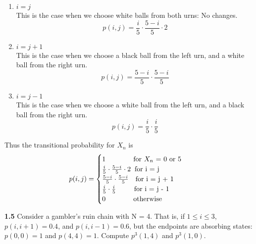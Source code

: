 \documentclass[12pt]{article}
\begin{document}
\begin{enumerate}[label=(\alph*)]
    \item $i = j$\\
          This is the case when we choose white balls from both urns: No changes. 
          $$p(i,j) = \frac{i}{5} \cdot \frac{5-i}{5} \cdot 2$$
    \item $i = j + 1$\\
          This is the case when we choose a black ball from the left urn, and a white ball from the right urn.
          $$p(i,j) = \frac{5-i}{5} \cdot \frac{5-i}{5}$$
    \item $i = j - 1 $\\
          This is the case when we choose a white ball from the left urn, and a black ball from the right urn.
          $$p(i,j) = \frac{i}{5} \cdot \frac{i}{5}$$
\end{enumerate}
Thus the transitional probability for $X_n$ is\\
$$
p(i,j)=\begin{cases}
1 \text{$\qquad\qquad$for $X_n$ = 0 or 5} \\
\frac{i}{5} \cdot \frac{5-i}{5} \cdot 2\text{\;\;for i = j} \\
\frac{5-i}{5} \cdot \frac{5-i}{5}\text{\quad for i = j + 1}\\
\frac{i}{5} \cdot \frac{i}{5}\text{\qquad\; for i = j - 1}\\
0 \text{\qquad\qquad otherwise}
\end{cases}$$

\newpage\noindent
\textbf{1.5} Consider a gambler’s ruin chain with N = 4. That is, if $1 \le i \le 3$,
$p(i, i + 1) = 0.4$, and $p(i, i - 1) = 0.6$, but the endpoints are absorbing states:
$p(0, 0) = 1$ and $p(4, 4) = 1$. Compute $p^3(1, 4)$ and $p^3(1, 0)$.\\
\end{document}
